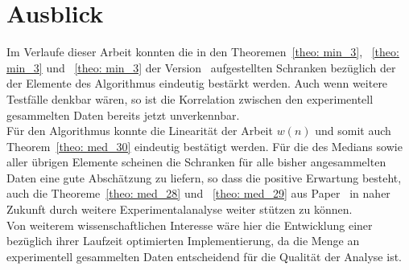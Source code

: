 \section{Ausblick}		%

\noindent
Im Verlaufe dieser Arbeit konnten die in den Theoremen~\ref{theo: min_3}, ~\ref{theo: min_3} und ~\ref{theo: min_3} der Version~\cite{meyer1} aufgestellten Schranken bezüglich der \fg der Elemente des Algorithmus \Rm eindeutig bestärkt werden. Auch wenn weitere Testfälle denkbar wären, so ist die Korrelation zwischen den experimentell gesammelten Daten bereits jetzt unverkennbar.\\[.05cm]
Für den Algorithmus \RM konnte die Linearität der Arbeit $w(n)$ und somit auch Theorem~\ref{theo: med_30} eindeutig bestätigt werden. Für die \fg des Medians sowie aller übrigen Elemente scheinen die Schranken für alle bisher angesammelten Daten eine gute Abschätzung zu liefern, so dass die positive Erwartung besteht, auch die Theoreme~\ref{theo: med_28} und ~\ref{theo: med_29} aus Paper~\cite{meyer2} in naher Zukunft durch weitere Experimentalanalyse weiter stützen zu können.\\[.05cm]
Von weiterem wissenschaftlichen Interesse wäre hier die Entwicklung einer bezüglich ihrer Laufzeit optimierten Implementierung, da die Menge an experimentell gesammelten Daten entscheidend für die Qualität der Analyse ist.\\[.2cm]






